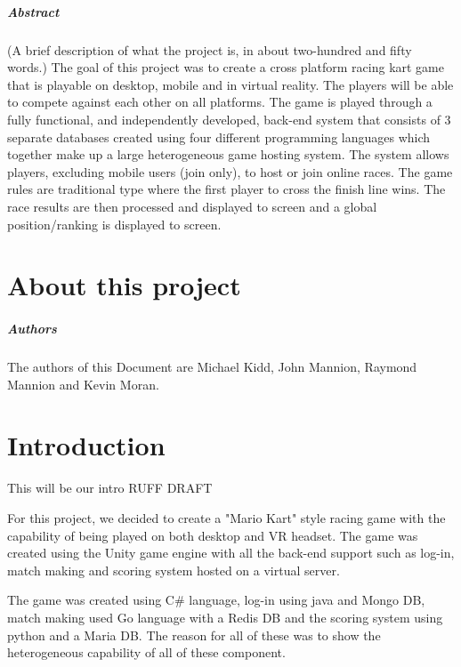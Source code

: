 
\paragraph{Abstract}
(A brief description of what the project is, in about two-hundred and fifty words.) 
The goal of this project was to create a cross platform racing kart game that is playable on desktop, mobile and in virtual reality. The players will be able to compete against each other on all platforms. The game is played through a fully functional, and independently developed, back-end system that consists of 3 separate databases created using four different programming languages which together make up a large heterogeneous game hosting system. The system allows players, excluding mobile users (join only), to host or join online races. The game rules are traditional type where the first player to cross the finish line wins. The race results are then processed and displayed to screen and a global position/ranking is displayed to screen.

\chapter*{About this project}

\paragraph{Authors}
The authors of this Document are Michael Kidd, John Mannion, Raymond Mannion and Kevin Moran.

\chapter{Introduction}
This will be our intro RUFF DRAFT


For this project, we decided to create a "Mario Kart" style racing game 
with the capability of being played on both desktop and VR headset. The game was created using the Unity game engine with all the back-end support such as log-in, match making and scoring system hosted on a virtual server. 

The game was created using C# language, log-in using java and Mongo DB,
match making used Go language with a Redis DB and the scoring system using python and a Maria DB. The reason for all of these was to show the heterogeneous capability of all of these component.

